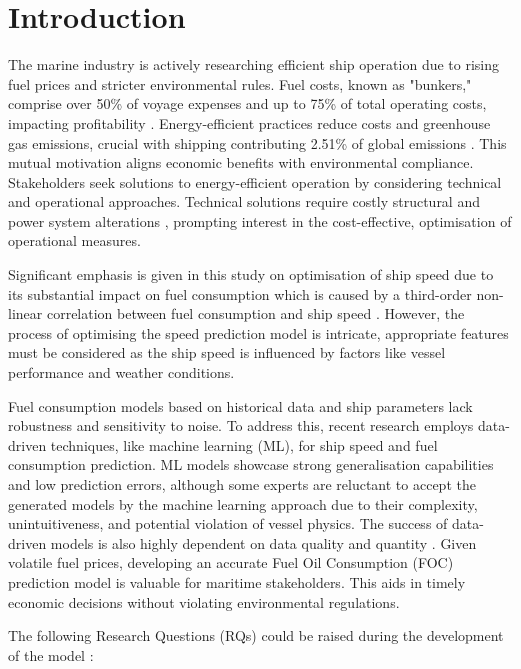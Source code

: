 \documentclass[]{interact}
\theoremstyle{plain}%
\theoremstyle{definition}
\theoremstyle{remark}
\begin{document}
\section{Introduction}

The marine industry is actively researching efficient ship operation due to rising fuel prices and stricter environmental rules. Fuel costs, known as "bunkers," comprise over 50\% of voyage expenses and up to 75\% of total operating costs, impacting profitability \citep{Bialystocki.2016}. Energy-efficient practices reduce costs and greenhouse gas emissions, crucial with shipping contributing 2.51\% of global emissions \citep{IMO.2020}. This mutual motivation aligns economic benefits with environmental compliance. Stakeholders seek solutions to energy-efficient operation by considering technical and operational approaches. Technical solutions require costly structural and power system alterations \citep{Yan.2021,Li.2022}, prompting interest in the cost-effective, optimisation of operational measures.

Significant emphasis is given in this study on optimisation of ship speed due to its substantial impact on fuel consumption which is caused by a third-order non-linear correlation between fuel consumption and ship speed \citep{Wang.2012,Du.2019}. However, the process of optimising the speed prediction model is intricate, appropriate features must be considered as the ship speed is influenced by factors like vessel performance and weather conditions.

Fuel consumption models based on historical data and ship parameters lack robustness and sensitivity to noise. To address this, recent research employs data-driven techniques, like machine learning (ML), for ship speed and fuel consumption prediction. ML models showcase strong generalisation capabilities and low prediction errors, although some experts are reluctant to accept the generated models by the machine learning approach due to their complexity, unintuitiveness, and potential violation of vessel physics. The success of data-driven models is also highly dependent on data quality and quantity \citep{Yan.2021,Gkerekos.2019}. Given volatile fuel prices, developing an accurate Fuel Oil Consumption (FOC) prediction model is valuable for maritime stakeholders. This aids in timely economic decisions without violating environmental regulations.

The following Research Questions (RQs) could be raised during the development of the model :
\end{document}
